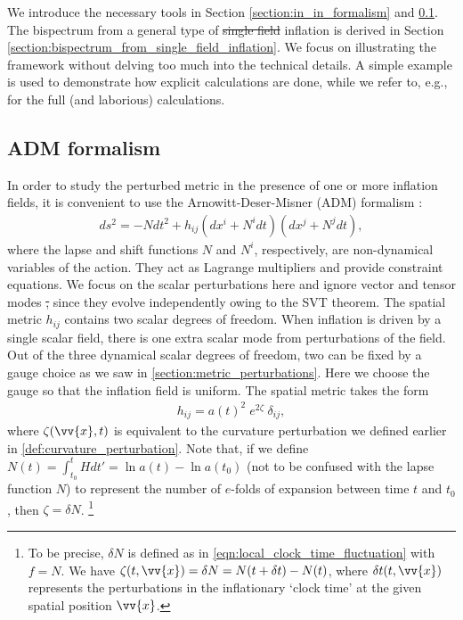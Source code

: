 \documentclass[a4paper,12pt,times,custombib,print,index]{Classes/PhDThesisPSnPDF} %
\providecommand{\DIFadd}[1]{{\protect\color{blue}\uwave{#1}}} %
\providecommand{\DIFdel}[1]{{\protect\color{red}\sout{#1}}}                      %
\providecommand{\DIFaddbegin}{} %
\providecommand{\DIFaddend}{} %
\providecommand{\DIFdelbegin}{} %
\providecommand{\DIFdelend}{} %
\newcommand{\DIFscaledelfig}{0.5}
\newlength{\DIFdelgraphicswidth} %
\newlength{\DIFdelgraphicsheight} %
\newcommand{\DIFaddincludegraphics}[2][]{{\color{blue}\fbox{\DIFOincludegraphics[#1]{#2}}}} %
\newcommand{\DIFdelincludegraphics}[2][]{%
\sbox{\DIFdelgraphicsbox}{\DIFOincludegraphics[#1]{#2}}%
\settoboxwidth{\DIFdelgraphicswidth}{\DIFdelgraphicsbox} %
\settoboxtotalheight{\DIFdelgraphicsheight}{\DIFdelgraphicsbox} %
\scalebox{\DIFscaledelfig}{%
\parbox[b]{\DIFdelgraphicswidth}{\usebox{\DIFdelgraphicsbox}\\[-\baselineskip] \rule{\DIFdelgraphicswidth}{0em}}\llap{\resizebox{\DIFdelgraphicswidth}{\DIFdelgraphicsheight}{%
\setlength{\unitlength}{\DIFdelgraphicswidth}%
\begin{picture}(1,1)%
\thicklines\linethickness{2pt} %
{\color[rgb]{1,0,0}\put(0,0){\framebox(1,1){}}}%
{\color[rgb]{1,0,0}\put(0,0){\line( 1,1){1}}}%
{\color[rgb]{1,0,0}\put(0,1){\line(1,-1){1}}}%
\end{picture}%
}\hspace*{3pt}}} %
} %
\DeclareRobustCommand{\DIFaddbegin}{\DIFOaddbegin \let\includegraphics\DIFaddincludegraphics} %
\DeclareRobustCommand{\DIFaddend}{\DIFOaddend \let\includegraphics\DIFOincludegraphics} %
\DeclareRobustCommand{\DIFdelbegin}{\DIFOdelbegin \let\includegraphics\DIFdelincludegraphics} %
\DeclareRobustCommand{\DIFdelend}{\DIFOaddend \let\includegraphics\DIFOincludegraphics} %
\begin{document}
We introduce the necessary tools in Section \ref{section:in_in_formalism} and \ref{section:ADM_formalism}. The bispectrum from a general type of \DIFdelbegin \DIFdel{single field }\DIFdelend \DIFaddbegin \DIFadd{single-field }\DIFaddend inflation is derived in Section \ref{section:bispectrum_from_single_field_inflation}. We focus on illustrating the framework without delving too much into the technical details. A simple example is used to demonstrate how explicit calculations are done, while we refer to, e.g., \cite{Maldacena2013,Chen2010review,Burrage2011large} for the full (and laborious) calculations.

\subsection{ADM formalism} \label{section:ADM_formalism}

In order to study the perturbed metric in the presence of one or more inflation fields, it is convenient to use the Arnowitt-Deser-Misner (ADM) formalism \cite{Arnowitt2008ADMrepublication}:
\begin{align}
	ds^2 = -N dt^2 + h_{ij}(dx^i + N^i dt) (dx^j + N^j dt),
\end{align}
where the lapse and shift functions $N$ and $N^i$, respectively, are non-dynamical variables of the action. They act as Lagrange multipliers and provide constraint equations. We focus on the scalar perturbations here and ignore vector and tensor modes \DIFdelbegin \DIFdel{, }\DIFdelend since they evolve independently owing to the SVT theorem. The spatial metric $h_{ij}$ contains two scalar degrees of freedom. When inflation is driven by a single scalar field, there is one extra scalar mode from perturbations of the field. Out of the three dynamical scalar degrees of freedom, two can be fixed by a gauge choice as we saw in \ref{section:metric_perturbations}. Here we choose the gauge so that the inflation field is uniform. The spatial metric takes the form
\begin{align}
	h_{ij} = a(t)^2 \;e^{2\zeta} \; \delta_{ij},  \label{eqn:spatial_metric_curvature_perturbation}
\end{align}
where $\zeta(\vv{x},t)$ is equivalent to the curvature perturbation we defined earlier in \eqref{def:curvature_perturbation}. Note that, if we define $N(t) = \int^{t}_{t_0} H dt' = \ln a(t) - \ln a(t_0)$ (not to be confused with the lapse function $N$) to represent the number of $e$-folds of expansion between time $t$ and $t_0$, then $\zeta = \delta N$. \footnote{To be precise, $\delta N$ is defined as in \eqref{eqn:local_clock_time_fluctuation} with $f=N$. We have $\zeta(t,\vv{x})= \delta N = N(t+\delta t) - N(t)$, where $\delta t(t,\vv{x})$ represents the perturbations in the inflationary `clock time' at the given spatial position $\vv{x}$.}
\end{document}
